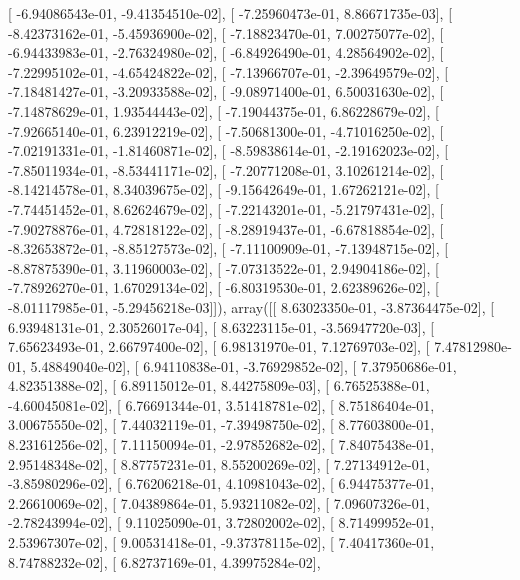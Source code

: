 \documentclass{article}
\begin{document}
       [ -6.94086543e-01,  -9.41354510e-02],
       [ -7.25960473e-01,   8.86671735e-03],
       [ -8.42373162e-01,  -5.45936900e-02],
       [ -7.18823470e-01,   7.00275077e-02],
       [ -6.94433983e-01,  -2.76324980e-02],
       [ -6.84926490e-01,   4.28564902e-02],
       [ -7.22995102e-01,  -4.65424822e-02],
       [ -7.13966707e-01,  -2.39649579e-02],
       [ -7.18481427e-01,  -3.20933588e-02],
       [ -9.08971400e-01,   6.50031630e-02],
       [ -7.14878629e-01,   1.93544443e-02],
       [ -7.19044375e-01,   6.86228679e-02],
       [ -7.92665140e-01,   6.23912219e-02],
       [ -7.50681300e-01,  -4.71016250e-02],
       [ -7.02191331e-01,  -1.81460871e-02],
       [ -8.59838614e-01,  -2.19162023e-02],
       [ -7.85011934e-01,  -8.53441171e-02],
       [ -7.20771208e-01,   3.10261214e-02],
       [ -8.14214578e-01,   8.34039675e-02],
       [ -9.15642649e-01,   1.67262121e-02],
       [ -7.74451452e-01,   8.62624679e-02],
       [ -7.22143201e-01,  -5.21797431e-02],
       [ -7.90278876e-01,   4.72818122e-02],
       [ -8.28919437e-01,  -6.67818854e-02],
       [ -8.32653872e-01,  -8.85127573e-02],
       [ -7.11100909e-01,  -7.13948715e-02],
       [ -8.87875390e-01,   3.11960003e-02],
       [ -7.07313522e-01,   2.94904186e-02],
       [ -7.78926270e-01,   1.67029134e-02],
       [ -6.80319530e-01,   2.62389626e-02],
       [ -8.01117985e-01,  -5.29456218e-03]]), array([[  8.63023350e-01,  -3.87364475e-02],
       [  6.93948131e-01,   2.30526017e-04],
       [  8.63223115e-01,  -3.56947720e-03],
       [  7.65623493e-01,   2.66797400e-02],
       [  6.98131970e-01,   7.12769703e-02],
       [  7.47812980e-01,   5.48849040e-02],
       [  6.94110838e-01,  -3.76929852e-02],
       [  7.37950686e-01,   4.82351388e-02],
       [  6.89115012e-01,   8.44275809e-03],
       [  6.76525388e-01,  -4.60045081e-02],
       [  6.76691344e-01,   3.51418781e-02],
       [  8.75186404e-01,   3.00675550e-02],
       [  7.44032119e-01,  -7.39498750e-02],
       [  8.77603800e-01,   8.23161256e-02],
       [  7.11150094e-01,  -2.97852682e-02],
       [  7.84075438e-01,   2.95148348e-02],
       [  8.87757231e-01,   8.55200269e-02],
       [  7.27134912e-01,  -3.85980296e-02],
       [  6.76206218e-01,   4.10981043e-02],
       [  6.94475377e-01,   2.26610069e-02],
       [  7.04389864e-01,   5.93211082e-02],
       [  7.09607326e-01,  -2.78243994e-02],
       [  9.11025090e-01,   3.72802002e-02],
       [  8.71499952e-01,   2.53967307e-02],
       [  9.00531418e-01,  -9.37378115e-02],
       [  7.40417360e-01,   8.74788232e-02],
       [  6.82737169e-01,   4.39975284e-02],
\end{document}
